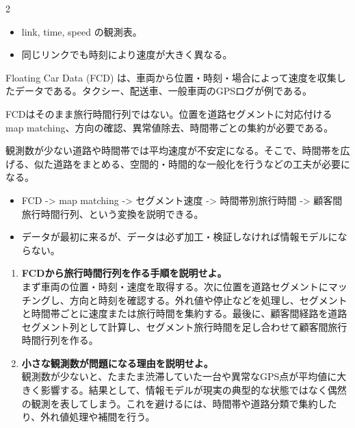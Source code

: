 \clearpage
{}
\begin{multicols}{2}\footnotesize\raggedcolumns
{}
\begin{itemize}
\item link, time, speed の観測表。
\item 同じリンクでも時刻により速度が大きく異なる。
\end{itemize}
Floating Car Data (FCD) は、車両から位置・時刻・場合によって速度を収集したデータである。タクシー、配送車、一般車両のGPSログが例である。\par

FCDはそのまま旅行時間行列ではない。位置を道路セグメントに対応付ける map matching、方向の確認、異常値除去、時間帯ごとの集約が必要である。\par

観測数が少ない道路や時間帯では平均速度が不安定になる。そこで、時間帯を広げる、似た道路をまとめる、空間的・時間的な一般化を行うなどの工夫が必要になる。\par
{}
\begin{itemize}
\item FCD -> map matching -> セグメント速度 -> 時間帯別旅行時間 -> 顧客間旅行時間行列、という変換を説明できる。
\item データが最初に来るが、データは必ず加工・検証しなければ情報モデルにならない。
\end{itemize}
\begin{enumerate}
\item \textbf{FCDから旅行時間行列を作る手順を説明せよ。}\\まず車両の位置・時刻・速度を取得する。次に位置を道路セグメントにマッチングし、方向と時刻を確認する。外れ値や停止などを処理し、セグメントと時間帯ごとに速度または旅行時間を集約する。最後に、顧客間経路を道路セグメント列として計算し、セグメント旅行時間を足し合わせて顧客間旅行時間行列を作る。
\item \textbf{小さな観測数が問題になる理由を説明せよ。}\\観測数が少ないと、たまたま渋滞していた一台や異常なGPS点が平均値に大きく影響する。結果として、情報モデルが現実の典型的な状態ではなく偶然の観測を表してしまう。これを避けるには、時間帯や道路分類で集約したり、外れ値処理や補間を行う。
\end{enumerate}
\end{multicols}

